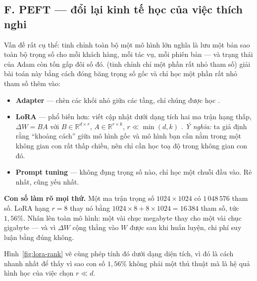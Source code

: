 \documentclass[../../../deep_learning.tex]{subfiles}
\begin{document}
\subsection{F. PEFT --- đổi lại kinh tế học của việc thích nghi}
Vấn đề rất cụ thể: tinh chỉnh toàn bộ một mô hình lớn nghĩa là lưu một bản sao toàn bộ trọng số cho mỗi khách hàng, mỗi tác vụ, mỗi phiên bản --- và trạng thái  của Adam còn tốn gấp đôi số đó.  (tinh chỉnh chỉ một phần rất nhỏ tham số) giải bài toán này bằng cách đóng băng trọng số gốc và chỉ học một phần rất nhỏ tham số thêm vào:

\begin{itemize}
\item \textbf{Adapter} --- chèn các khối nhỏ giữa các tầng, chỉ chúng được học \cite{houlsby2019adapter}.
\item \textbf{LoRA} --- phổ biến hơn: viết cập nhật dưới dạng tích hai ma trận hạng thấp, $\Delta W = BA$ với $B \in \mathbb{R}^{d \times r}$, $A \in \mathbb{R}^{r \times k}$, $r \ll \min(d,k)$ \cite{hu2022lora}. \emph{Ý nghĩa:} ta giả định rằng ``khoảng cách'' giữa mô hình gốc và mô hình bạn cần nằm trong một không gian con rất thấp chiều, nên chỉ cần học toạ độ trong không gian con đó.
\item \textbf{Prompt tuning} --- không đụng trọng số nào, chỉ học một chuỗi  đầu vào. Rẻ nhất, cũng yếu nhất.
\end{itemize}

\textbf{Con số làm rõ mọi thứ.} Một ma trận trọng số $1024 \times 1024$ có $1\,048\,576$ tham số. LoRA hạng $r = 8$ thay nó bằng $1024{\times}8 + 8{\times}1024 = 16\,384$ tham số, tức $1{,}56\%$. Nhân lên toàn mô hình: một  vài chục megabyte thay cho một  vài chục gigabyte --- và vì $\Delta W$ cộng thẳng vào $W$ được sau khi huấn luyện, chi phí suy luận bằng đúng không.

Hình~\ref{fig:lora-rank} vẽ cùng phép tính đó dưới dạng diện tích, vì đó là cách nhanh nhất để thấy vì sao con số $1{,}56\%$ không phải một thủ thuật mà là hệ quả hình học của việc chọn $r \ll d$.
\end{document}
